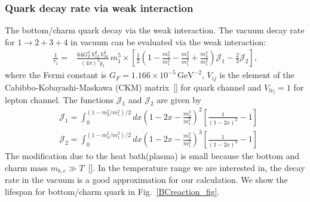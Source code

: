 \subsubsection{Quark decay rate via weak interaction}
The bottom/charm quark decay via the weak interaction. 
The vacuum decay rate for $1\to2+3+4$ in vacuum can be evaluated via the weak interaction:
\begin{align}
\frac{1}{\tau_1}=&\frac{64G^2_F\,V^2_{12}\,V^2_{34}}{(4\pi)^3g_1}\,m^5_1\times\left[\frac{1}{2}{\left(1-\frac{m^2_2}{m^2_1}-\frac{m^2_3}{m^2_1}+\frac{m^2_4}{m^2_1}\right)}\mathcal{J}_1-\frac{2}{3}\mathcal{J}_2\right],
\end{align}
where the Fermi constant is $G_F=1.166\times10^{-5}\,\mathrm{GeV}^{-2}$, $V_{ij}$ is the element of the Cabibbo-Kobayashi-Maskawa (CKM) matrix~[\cite{Czarnecki:2004cw}] for quark channel and $V_{l\nu_l}=1$ for lepton channel. The functions $\mathcal{J}_1$ and $\mathcal{J}_2$ are given by
\begin{align}
&\mathcal{J}_1\!=\!\!\!\int_0^{(1-m^2_2/m^2_1)/2}\!\!\!\!\!\!\!\!dx\left(1\!-\!2x\!-\!\frac{m^2_2}{m_1^2}\right)^{\!\!2}\left[\frac{1}{(1-2x)^2}-1\right]\\
&\mathcal{J}_2\!=\!\!\!\int_0^{(1-m^2_2/m^2_1)/2}\!\!\!\!\!\!\!\!dx\left(1\!-\!2x\!-\!\frac{m^2_2}{m_1^2}\right)^{\!\!3}\left[\frac{1}{(1-2x)^3}-1\right]
\end{align}
The modification due to the heat bath(plasma) is small because the bottom and charm  mass $m_{b,c}\gg T$~[\cite{Kuznetsova:2008jt}]. In the temperature range we are interested in, the decay rate in the vacuum is a good approximation for our calculation. We show the lifespan for bottom/charm quark in Fig.~\ref{BCreaction_fig}. 




